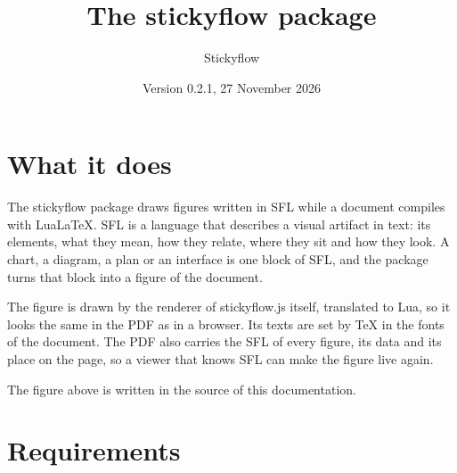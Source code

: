 \documentclass{article}
\title{The stickyflow package}
\author{Stickyflow}
\date{Version 0.2.1, 27 November 2026}
\begin{document}
\maketitle

\section{What it does}

The stickyflow package draws figures written in SFL while a document compiles with LuaLaTeX. SFL is a language that describes a visual
artifact in text: its elements, what they mean, how they relate, where they sit and how they look. A chart, a diagram, a plan or an
interface is one block of SFL, and the package turns that block into a figure of the document.

The figure is drawn by the renderer of stickyflow.js itself, translated to Lua, so it looks the same in the PDF as in a browser. Its texts
are set by TeX in the fonts of the document. The PDF also carries the SFL of every figure, its data and its place on the page, so a viewer
that knows SFL can make the figure live again.

\begin{center}
\end{center}

The figure above is written in the source of this documentation.

\section{Requirements}
\end{document}

